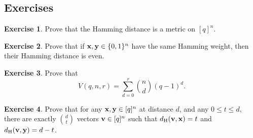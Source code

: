 \documentclass[a4paper, 11pt, openany]{book}
\numberwithin{equation}{section}
\theoremstyle{plain}
\theoremstyle{definition}
\newtheorem{exercise}   {Exercise}  [section]
\newcommand{\dH}{d_\mathrm{H}}
\newcommand{\Important}[1]{\textcolor{red}{#1}}
\begin{document}




\subsection{Exercises}



\begin{exercise}
Prove that the Hamming distance is a metric on $[q]^n$.
\end{exercise}




\begin{exercise}
Prove that if ${\bf x}, {\bf y} \in \{0,1\}^n$ have the same Hamming weight, then their Hamming distance is even.
\end{exercise}











\begin{exercise}
Prove that 
\[
    V(q,n,r) = \sum_{d=0}^r \binom{n}{d} (q-1)^d.
\]
\end{exercise}


\begin{exercise}
Prove that for any ${\bf x}, {\bf y} \in [q]^n$ at distance $d$, and any $0 \le t \le d$, there are exactly $\binom{d}{t}$ vectors ${\bf v} \in [q]^n$ such that $\dH({\bf v}, {\bf x}) = t$ and $\dH({\bf v}, {\bf y}) = d-t$.
\end{exercise}
\end{document}
